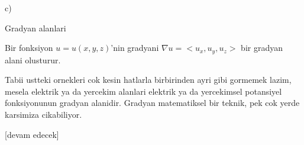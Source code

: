 \documentclass[12pt,fleqn]{article}\usepackage{../../common}
\begin{document}
c)

Gradyan alanlari

Bir fonksiyon $u = u(x,y,z)$'nin gradyani $\nabla u = < u_x, u_y, u_z >$
bir gradyan alani olusturur.

Tabii ustteki ornekleri cok kesin hatlarla birbirinden ayri gibi gormemek lazim,
mesela elektrik ya da yercekim alanlari elektrik ya da yercekimsel potansiyel
fonksiyonunun gradyan alanidir. Gradyan matematiksel bir teknik, pek cok
yerde karsimiza cikabiliyor.









[devam edecek]
\end{document}

